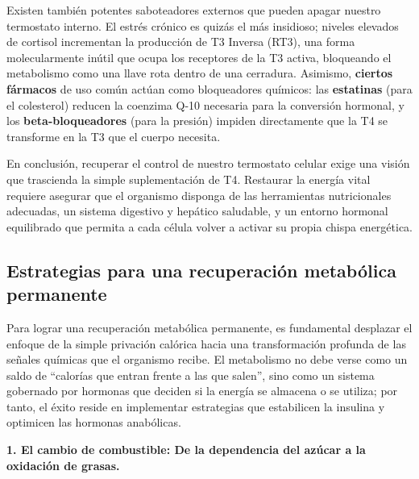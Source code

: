 \documentclass[
  spanish,
]{article}
\begin{document}
Existen también potentes saboteadores externos que pueden apagar nuestro termostato interno. El estrés crónico es quizás el más insidioso; niveles elevados de cortisol incrementan la producción de T3 Inversa (RT3), una forma molecularmente inútil que ocupa los receptores de la T3 activa, bloqueando el metabolismo como una llave rota dentro de una cerradura. Asimismo, \textbf{ciertos fármacos} de uso común actúan como bloqueadores químicos: las \textbf{estatinas} (para el colesterol) reducen la coenzima Q-10 necesaria para la conversión hormonal, y los \textbf{beta-bloqueadores} (para la presión) impiden directamente que la T4 se transforme en la T3 que el cuerpo necesita.

En conclusión, recuperar el control de nuestro termostato celular exige una visión que trascienda la simple suplementación de T4. Restaurar la energía vital requiere asegurar que el organismo disponga de las herramientas nutricionales adecuadas, un sistema digestivo y hepático saludable, y un entorno hormonal equilibrado que permita a cada célula volver a activar su propia chispa energética.

\subsection{Estrategias para una recuperación metabólica permanente}\label{estrategias-para-una-recuperaciuxf3n-metabuxf3lica-permanente}

Para lograr una recuperación metabólica permanente, es fundamental desplazar el enfoque de la simple privación calórica hacia una transformación profunda de las señales químicas que el organismo recibe. El metabolismo no debe verse como un saldo de ``calorías que entran frente a las que salen'', sino como un sistema gobernado por hormonas que deciden si la energía se almacena o se utiliza; por tanto, el éxito reside en implementar estrategias que estabilicen la insulina y optimicen las hormonas anabólicas.

\textbf{1. El cambio de combustible: De la dependencia del azúcar a la oxidación de grasas.}
\end{document}
